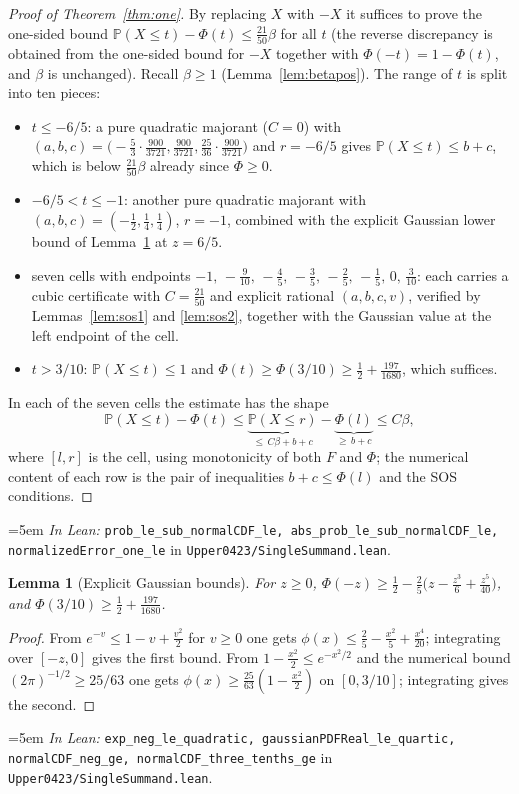 \documentclass[11pt,a4paper]{article}
\newtheorem{lemma}[theorem]{Lemma}
\theoremstyle{definition}
\newcommand{\PP}{\mathbb{P}}
\newcommand{\Lean}[1]{\texttt{#1}}
\newcommand{\file}[1]{\texttt{#1}}
\newcommand{\formal}[2]{%
  \par\smallskip
  \begingroup\small\raggedright\emergencystretch=5em
  \noindent\textit{In Lean:} \Lean{#1} in \file{#2}.\par
  \endgroup\smallskip}
\begin{document}
\begin{proof}[Proof of Theorem~\ref{thm:one}]
  By replacing $X$ with $-X$ it suffices to prove the one-sided bound
  $\PP(X\le t)-\Phi(t)\le\tfrac{21}{50}\beta$ for all $t$ (the reverse
  discrepancy is obtained from the one-sided bound for $-X$ together with
  $\Phi(-t)=1-\Phi(t)$, and $\beta$ is unchanged). Recall $\beta\ge1$
  (Lemma~\ref{lem:betapos}). The range of $t$ is split into ten pieces:
  \begin{itemize}[leftmargin=1.6em]
  \item $t\le-6/5$: a pure quadratic majorant ($C=0$) with
    $(a,b,c)=\bigl(-\tfrac53\cdot\tfrac{900}{3721},\tfrac{900}{3721},
    \tfrac{25}{36}\cdot\tfrac{900}{3721}\bigr)$ and $r=-6/5$ gives
    $\PP(X\le t)\le b+c$, which is below $\tfrac{21}{50}\beta$ already since
    $\Phi\ge0$.
  \item $-6/5<t\le-1$: another pure quadratic majorant with
    $(a,b,c)=(-\tfrac12,\tfrac14,\tfrac14)$, $r=-1$, combined with the explicit
    Gaussian lower bound of Lemma~\ref{lem:gauss} at $z=6/5$.
  \item seven cells with endpoints
    $-1,\,-\tfrac9{10},\,-\tfrac45,\,-\tfrac35,\,-\tfrac25,\,-\tfrac15,\,0,\,\tfrac3{10}$:
    each carries a cubic certificate with $C=\tfrac{21}{50}$ and explicit
    rational $(a,b,c,v)$, verified by Lemmas~\ref{lem:sos1} and \ref{lem:sos2},
    together with the Gaussian value at the left endpoint of the cell.
  \item $t>3/10$: $\PP(X\le t)\le1$ and
    $\Phi(t)\ge\Phi(3/10)\ge\tfrac12+\tfrac{197}{1680}$, which suffices.
  \end{itemize}
  In each of the seven cells the estimate has the shape
  \[
    \PP(X\le t)-\Phi(t)
    \le \underbrace{\PP(X\le r)}_{\le\,C\beta+b+c}-\underbrace{\Phi(l)}_{\ge\,b+c}
    \le C\beta ,
  \]
  where $[l,r]$ is the cell, using monotonicity of both $F$ and $\Phi$; the
  numerical content of each row is the pair of inequalities $b+c\le\Phi(l)$ and
  the SOS conditions.
\end{proof}
\formal{prob\_le\_sub\_normalCDF\_le, abs\_prob\_le\_sub\_normalCDF\_le, normalizedError\_one\_le}{Upper0423/SingleSummand.lean}

\begin{lemma}[Explicit Gaussian bounds]
  \label{lem:gauss}
  For $z\ge0$,
  $\Phi(-z)\ge\tfrac12-\tfrac25\bigl(z-\tfrac{z^3}{6}+\tfrac{z^5}{40}\bigr)$, and
  $\Phi(3/10)\ge\tfrac12+\tfrac{197}{1680}$.
\end{lemma}
\begin{proof}
  From $e^{-v}\le1-v+\tfrac{v^2}2$ for $v\ge0$ one gets
  $\phi(x)\le\tfrac25-\tfrac{x^2}5+\tfrac{x^4}{20}$; integrating over $[-z,0]$
  gives the first bound. From $1-\tfrac{x^2}2\le e^{-x^2/2}$ and the numerical
  bound $(2\pi)^{-1/2}\ge25/63$ one gets
  $\phi(x)\ge\tfrac{25}{63}(1-\tfrac{x^2}2)$ on $[0,3/10]$; integrating gives the
  second.
\end{proof}
\formal{exp\_neg\_le\_quadratic, gaussianPDFReal\_le\_quartic, normalCDF\_neg\_ge, normalCDF\_three\_tenths\_ge}{Upper0423/SingleSummand.lean}
\end{document}
